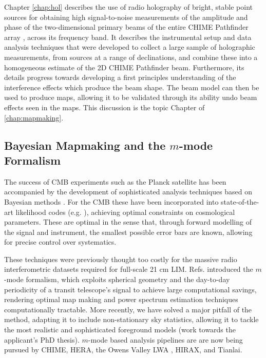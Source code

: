 Chapter \ref{chap:hol} describes the use of radio holography of bright, stable point sources for obtaining high signal-to-noise measurements of the amplitude and phase of the two-dimensional primary beams of the entire CHIME Pathfinder array \citep{chimepath1}, across its frequency band. It describes the instrumental setup and data analysis techniques that were developed to collect a large sample of holographic measurements, from sources at a range of declinations, and combine these into a homogeneous estimate of the 2D CHIME Pathfinder beam. Furthermore, its details progress towards developing a first principles understanding of the interference effects which produce the beam shape. The beam model can then be used to produce maps, allowing it to be validated through its ability undo beam effects seen in the maps. This discussion is the topic Chapter of \ref{chap:mapmaking}.

\subsection{\label{sec:bg:subsec:mmodes} Bayesian Mapmaking and the $m$-mode Formalism}

The success of CMB experiments such as the Planck satellite has been accompanied by the development of sophisticated analysis techniques based on Bayesian methods \citep{bondjaffeknox}. For the CMB these have been incorporated into state-of-the-art likelihood codes (e.g. \citep{commander}), achieving optimal constraints on cosmological parameters. These are optimal in the sense that, through forward modelling of the signal and instrument, the smallest possible error bars are known, allowing for precise control over systematics.

These techniques were previously thought too costly for the massive radio interferometric datasets required for full-scale 21 cm LIM. Refs. \citep{mmodes1, mmodes2} introduced the $m$-mode formalism, which exploits spherical geometry and the day-to-day periodicity of a transit telescope's signal to achieve large computational savings, rendering optimal map making and power spectrum estimation techniques computationally tractable. More recently, we have solved a major pitfall of the method, adapting it to include non-stationary sky statistics, allowing it to tackle the most realistic and sophisticated foreground models \citep{bergeroppermann} (work towards the applicant's PhD thesis). $m$-mode based analysis pipelines are are now being pursued by CHIME, HERA, the Owens Valley LWA \citep{eastwoodetal}, HIRAX, and Tianlai.